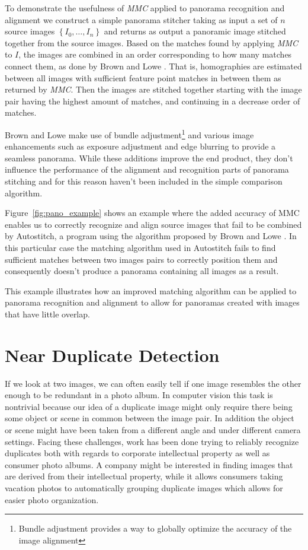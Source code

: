 To demonstrate the usefulness of \emph{MMC} applied to panorama 
recognition and alignment we construct a simple panorama stitcher taking
as input a set of $n$ source images $\left\{I_0, \ldots, I_n\right\}$ 
and returns as output a panoramic image stitched together from the 
source images. Based on the matches found by applying \emph{MMC} to $I$, 
the images are combined in an order corresponding to how many matches 
connect them, as done by Brown and Lowe \cite{brown2007automatic}. That 
is, homographies are estimated between all images with sufficient 
feature point matches in between them as returned by \emph{MMC}. Then 
the images are stitched together starting with the image pair having the 
highest amount of matches, and continuing in a decrease order of 
matches.

Brown and Lowe make use of bundle adjustment\footnote{Bundle adjustment 
provides a way to globally optimize the accuracy of the image alignment} 
and various image enhancements such as exposure adjustment and edge 
blurring to provide a seamless panorama. While these additions improve 
the end product, they don't influence the performance of the alignment 
and recognition parts of panorama stitching and for this reason haven't 
been included in the simple comparison algorithm.

Figure~\ref{fig:pano_example} shows an example where the added accuracy 
of MMC enables us to correctly recognize and align source images that 
fail to be combined by Autostitch, a program using the algorithm 
proposed by Brown and Lowe \cite{brown2007automatic}. In this particular
case the matching algorithm used in Autostitch fails to find sufficient 
matches between two images pairs to correctly position them and 
consequently doesn't produce a panorama containing all images as a 
result.

This example illustrates how an improved matching algorithm can be 
applied to panorama recognition and alignment to allow for panoramas 
created with images that have little overlap.

\section{Near Duplicate Detection}
If we look at two images, we can often easily tell if one image 
resembles the other enough to be redundant in a photo album. In computer 
vision this task is nontrivial because our idea of a duplicate image 
might only require there being some object or scene in common between 
the image pair. In addition the object or scene might have been taken 
from a different angle and under different camera settings. Facing these 
challenges, work has been done trying to reliably recognize duplicates 
both with regards to corporate intellectual property as well as consumer 
photo albums.  A company might be interested in finding images that are 
derived from their intellectual property, while it allows consumers 
taking vacation photos to automatically grouping duplicate images which 
allows for easier photo organization.

